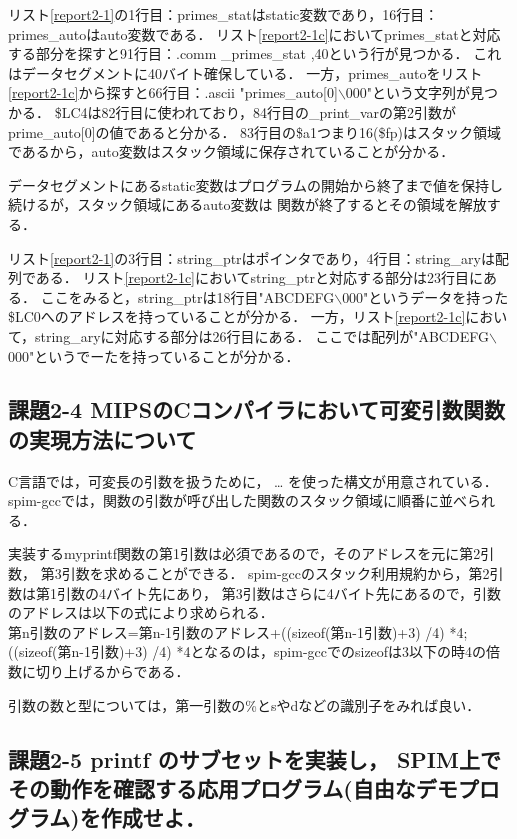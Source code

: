 \documentclass[11pt]{jarticle}
\begin{document}
リスト\ref{report2-1}の1行目：primes\_statはstatic変数であり，16行目：primes\_autoはauto変数である．
リスト\ref{report2-1c}においてprimes\_statと対応する部分を探すと91行目：.comm \_primes\_stat ,40という行が見つかる．
これはデータセグメントに40バイト確保している．
一方，primes\_autoをリスト\ref{report2-1c}から探すと66行目：.ascii "primes\_auto[0]$\backslash$000"という文字列が見つかる．
\$LC4は82行目に使われており，84行目の\_print\_varの第2引数がprime\_auto[0]の値であると分かる．
83行目の\$a1つまり16(\$fp)はスタック領域であるから，auto変数はスタック領域に保存されていることが分かる．

データセグメントにあるstatic変数はプログラムの開始から終了まで値を保持し続けるが，スタック領域にあるauto変数は
関数が終了するとその領域を解放する．

リスト\ref{report2-1}の3行目：string\_ptrはポインタであり，4行目：string\_aryは配列である．
リスト\ref{report2-1c}においてstring\_ptrと対応する部分は23行目にある．
ここをみると，string\_ptrは18行目"ABCDEFG$\backslash$000"というデータを持った\$LC0へのアドレスを持っていることが分かる．
一方，リスト\ref{report2-1c}において，string\_aryに対応する部分は26行目にある．
ここでは配列が"ABCDEFG$\backslash$000"というでーたを持っていることが分かる．

\subsection{課題2-4 MIPSのCコンパイラにおいて可変引数関数の実現方法について}

C言語では，可変長の引数を扱うために， … を使った構文が用意されている．
spim-gccでは，関数の引数が呼び出した関数のスタック領域に順番に並べられる．

実装するmyprintf関数の第1引数は必須であるので，そのアドレスを元に第2引数，
第3引数を求めることができる．
spim-gccのスタック利用規約から，第2引数は第1引数の4バイト先にあり，
第3引数はさらに4バイト先にあるので，引数のアドレスは以下の式により求められる．
\\
第n引数のアドレス=第n-1引数のアドレス+((sizeof(第n-1引数)+3) /4) *4;
\\
((sizeof(第n-1引数)+3) /4) *4となるのは，spim-gccでのsizeofは3以下の時4の倍数に切り上げるからである．

引数の数と型については，第一引数の\%とsやdなどの識別子をみれば良い．

\subsection{課題2-5 printf のサブセットを実装し， SPIM上でその動作を確認する応用プログラム(自由なデモプログラム)を作成せよ．}
\end{document}
